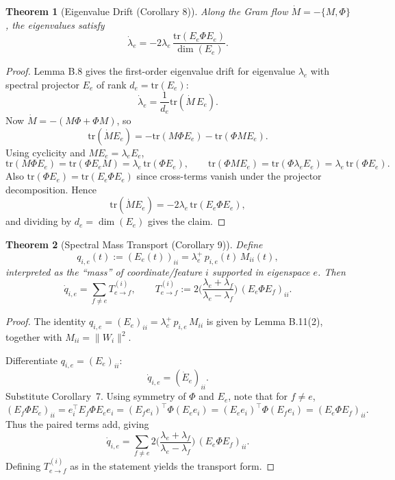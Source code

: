 \documentclass{article}
\theoremstyle{plain}
\newtheorem{theorem}{Theorem}
\numberwithin{equation}{section}
\theoremstyle{definition}
\theoremstyle{remark}
\begin{document}
\begin{lemmaproofbox}
\begin{theorem}[Eigenvalue Drift (Corollary 8)]
Along the Gram flow $\dot M=-\{M,\Phi\}$, the eigenvalues satisfy
\[
\dot\lambda_e = -2\lambda_e\,\frac{\mathrm{tr}(E_e\Phi E_e)}{\dim(E_e)}.
\]
\end{theorem}
\begin{proof}
Lemma B.8 gives the first-order eigenvalue drift for eigenvalue $\lambda_e$ with spectral projector $E_e$ of rank
$d_e=\mathrm{tr}(E_e)$:
\[
\dot\lambda_e = \frac{1}{d_e}\mathrm{tr}(\dot M\,E_e).
\]
Now $\dot M=-(M\Phi+\Phi M)$, so
\[
\mathrm{tr}(\dot M E_e) = -\mathrm{tr}(M\Phi E_e)-\mathrm{tr}(\Phi M E_e).
\]
Using cyclicity and $ME_e=\lambda_e E_e$,
\[
\mathrm{tr}(M\Phi E_e)=\mathrm{tr}(\Phi E_e M)=\lambda_e\,\mathrm{tr}(\Phi E_e),
\qquad
\mathrm{tr}(\Phi M E_e)=\mathrm{tr}(\Phi \lambda_e E_e)=\lambda_e\,\mathrm{tr}(\Phi E_e).
\]
Also $\mathrm{tr}(\Phi E_e)=\mathrm{tr}(E_e\Phi E_e)$ since cross-terms vanish under the projector decomposition.
Hence
\[
\mathrm{tr}(\dot M E_e) = -2\lambda_e\,\mathrm{tr}(E_e\Phi E_e),
\]
and dividing by $d_e=\dim(E_e)$ gives the claim.
\end{proof}
\end{lemmaproofbox}


\begin{lemmaproofbox}
\begin{theorem}[Spectral Mass Transport (Corollary 9)]
Define
\[
q_{i,e}(t):=(E_e(t))_{ii}=\lambda_e^+\,p_{i,e}(t)\,M_{ii}(t),
\]
interpreted as the “mass” of coordinate/feature $i$ supported in eigenspace $e$. Then
\[
\dot q_{i,e}=\sum_{f\neq e} T^{(i)}_{e\to f},
\qquad
T^{(i)}_{e\to f}
:= 2\Big(\frac{\lambda_e+\lambda_f}{\lambda_e-\lambda_f}\Big)\,(E_e\Phi E_f)_{ii}.
\]
\end{theorem}
\begin{proof}
The identity $q_{i,e}=(E_e)_{ii}=\lambda_e^+\,p_{i,e}\,M_{ii}$ is
given by Lemma B.11(2), together with $M_{ii}=\|W_i\|^2$.

Differentiate $q_{i,e}=(E_e)_{ii}$:
\[
\dot q_{i,e} = (\dot E_e)_{ii}.
\]
Substitute Corollary~7. Using symmetry of $\Phi$ and $E_e$, note that for $f\neq e$,
\[
(E_f\Phi E_e)_{ii}
= e_i^\top E_f\Phi E_e e_i
= (E_f e_i)^\top \Phi (E_e e_i)
= (E_e e_i)^\top \Phi (E_f e_i)
= (E_e\Phi E_f)_{ii}.
\]
Thus the paired terms add, giving
\[
\dot q_{i,e}
=\sum_{f\neq e}2\Big(\frac{\lambda_e+\lambda_f}{\lambda_e-\lambda_f}\Big)\,(E_e\Phi E_f)_{ii}.
\]
Defining $T^{(i)}_{e\to f}$ as in the statement yields the transport form.
\end{proof}
\end{lemmaproofbox}
\end{document}
